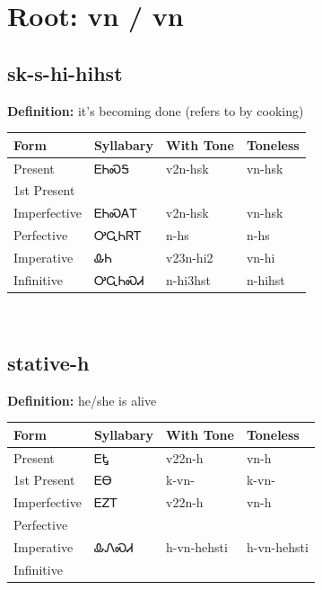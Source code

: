 \documentclass{article}%
\begin{document}
%
\normalsize%
\section*{Root: vn / vn}%
\subsection*{sk-s-hi-hihst}%
\textbf{Definition: }%
it’s becoming done (refers to by cooking)%
\\[0.5em]%
\begin{tabular}{|l|l|l|l|}%
\hline%
\textbf{Form}&\textbf{Syllabary}&\textbf{With Tone}&\textbf{Toneless}\\%
\hline%
Present&ᎬᏂᏍᎦ&v2n{-}hsk&vn{-}hsk\\%
1st Present&&&\\%
Imperfective&ᎬᏂᏍᎪᎢ&v2n{-}hsk&vn{-}hsk\\%
Perfective&ᎤᏩᏂᏒᎢ&n{-}hs&n{-}hs\\%
Imperative&ᎲᏂ&v23n{-}hi2&vn{-}hi\\%
Infinitive&ᎤᏩᏂᏍᏗ&n{-}hi3hst&n{-}hihst\\%
\hline%
\end{tabular}%
\\[1em]%
\subsection*{stative-h}%
\textbf{Definition: }%
he/she is alive%
\\[0.5em]%
\begin{tabular}{|l|l|l|l|}%
\hline%
\textbf{Form}&\textbf{Syllabary}&\textbf{With Tone}&\textbf{Toneless}\\%
\hline%
Present&ᎬᎿ&v22n{-}h&vn{-}h\\%
1st Present&ᎬᎾ&k{-}vn{-}&k{-}vn{-}\\%
Imperfective&ᎬᏃᎢ&v22n{-}h&vn{-}h\\%
Perfective&&&\\%
Imperative&ᎲᏁᏍᏗ&h{-}vn{-}hehsti&h{-}vn{-}hehsti\\%
Infinitive&&&\\%
\hline%
\end{tabular}%
\\[1em]%
\end{document}
